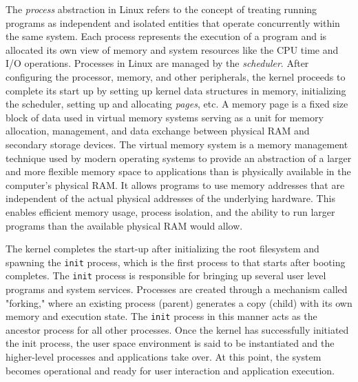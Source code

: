 The \textit{process} abstraction in Linux refers to the concept of treating running programs as independent and isolated entities that operate concurrently within the same system. Each process represents the execution of a program and is allocated its own view of memory and system resources like the CPU time and I/O operations. Processes in Linux are managed by the \textit{scheduler}. After configuring the processor, memory, and other peripherals, the kernel proceeds to complete its start up by setting up kernel data structures in memory, initializing the scheduler, setting up and allocating \textit{pages}, etc. A memory page is a fixed size block of data used in virtual memory systems serving as a unit for memory allocation, management, and data exchange between physical RAM and secondary storage devices. The virtual memory system is a memory management technique used by modern operating systems to provide an abstraction of a larger and more flexible memory space to applications than is physically available in the computer's physical RAM. It allows programs to use memory addresses that are independent of the actual physical addresses of the underlying hardware. This enables efficient memory usage, process isolation, and the ability to run larger programs than the available physical RAM would allow.

\begin{figure}[h]
	\centering
\end{figure}

The kernel completes the start-up after initializing the root filesystem and spawning the \texttt{init} process, which is the first process to that starts after booting completes. The \texttt{init} process is responsible for bringing up several user level programs and system services. Processes are created through a mechanism called "forking," where an existing process (parent) generates a copy (child) with its own memory and execution state. The \texttt{init} process in this manner acts as the ancestor process for all other processes. Once the kernel has successfully initiated the init process, the user space environment is said to be instantiated and the higher-level processes and applications take over. At this point, the system becomes operational and ready for user interaction and application execution.

